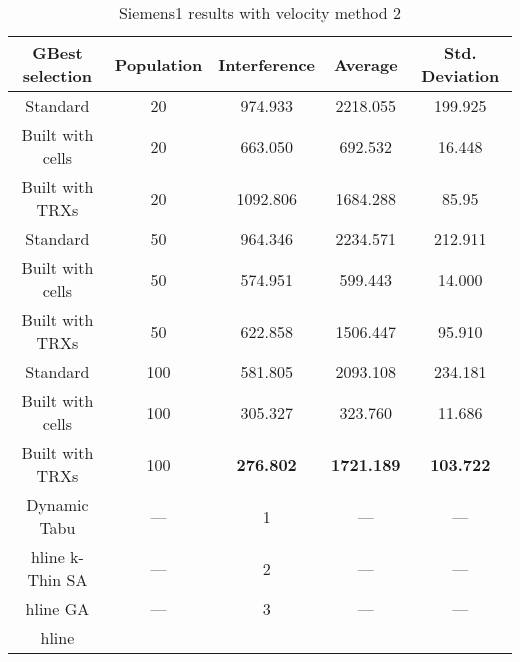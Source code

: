 \begin{table}[H]
\centering
	\begin{tabular}{| c | c | c | c | c |}
	\hline
	GBest selection & Population & Interference & Average & Std. Deviation\\ \hline
	Standard & 20 & 974.933 & 2218.055 & 199.925\\ \hline
	Built with cells & 20 & 663.050 & 692.532 & 16.448\\ \hline
	Built with TRXs & 20 & 1092.806 & 1684.288 & 85.95\\ \hline
	Standard & 50 & 964.346 & 2234.571 & 212.911\\ \hline
	Built with cells & 50 & 574.951 & 599.443 & 14.000\\ \hline
	Built with TRXs & 50 & 622.858 & 1506.447 & 95.910\\ \hline
	Standard & 100 & 581.805 & 2093.108 & 234.181\\ \hline
	Built with cells & 100 & 305.327 & 323.760 & 11.686\\ \hline
	Built with TRXs & 100 & \textbf{276.802} & \textbf{1721.189} & \textbf{103.722}\\ \hline
    Dynamic Tabu & --- & 1 & --- & --- \\hline
    k-Thin SA & --- & 2 & --- & --- \\hline
    GA & --- & 3 & --- & --- \\hline
	\end{tabular}
	\caption{Siemens1 results with velocity method 2}
	\label{tab:siem1m2}
\end{table}
